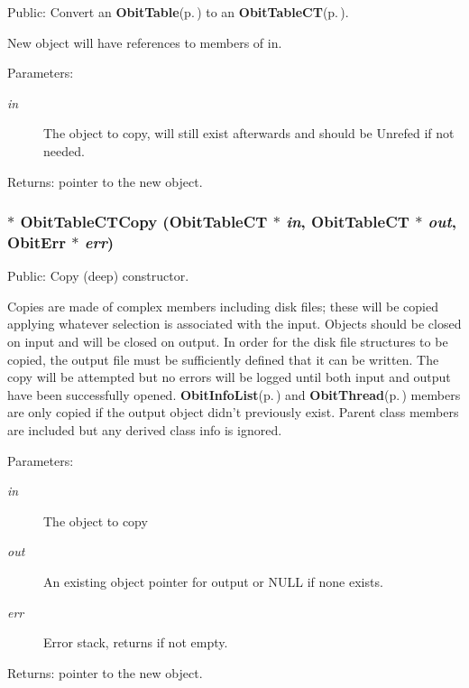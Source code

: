 Public: Convert an {\bf Obit\-Table}{\rm (p.\,\pageref{structObitTable})} to an {\bf Obit\-Table\-CT}{\rm (p.\,\pageref{structObitTableCT})}. 

New object will have references to members of in. \begin{Desc}
\item[Parameters:]
\begin{description}
\item[{\em in}]The object to copy, will still exist afterwards and should be Unrefed if not needed. \end{description}
\end{Desc}
\begin{Desc}
\item[Returns:]pointer to the new object. \end{Desc}
\subsubsection{$\ast$ Obit\-Table\-CTCopy ({\bf Obit\-Table\-CT} $\ast$ {\em in}, {\bf Obit\-Table\-CT} $\ast$ {\em out}, {\bf Obit\-Err} $\ast$ {\em err})}\label{ObitTableCT_8h_a14}


Public: Copy (deep) constructor. 

Copies are made of complex members including disk files; these will be copied applying whatever selection is associated with the input. Objects should be closed on input and will be closed on output. In order for the disk file structures to be copied, the output file must be sufficiently defined that it can be written. The copy will be attempted but no errors will be logged until both input and output have been successfully opened. {\bf Obit\-Info\-List}{\rm (p.\,\pageref{structObitInfoList})} and {\bf Obit\-Thread}{\rm (p.\,\pageref{structObitThread})} members are only copied if the output object didn't previously exist. Parent class members are included but any derived class info is ignored. \begin{Desc}
\item[Parameters:]
\begin{description}
\item[{\em in}]The object to copy \item[{\em out}]An existing object pointer for output or NULL if none exists. \item[{\em err}]Error stack, returns if not empty. \end{description}
\end{Desc}
\begin{Desc}
\item[Returns:]pointer to the new object. \end{Desc}
